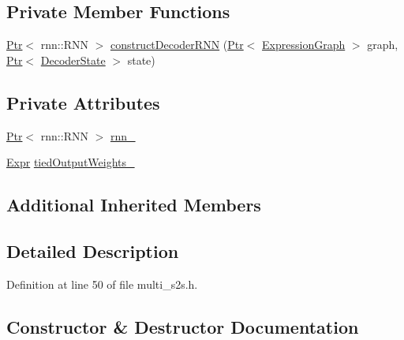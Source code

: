 \subsection*{Private Member Functions}
\begin{DoxyCompactItemize}
\item 
\hyperlink{namespacemarian_ad1a373be43a00ef9ce35666145137b08}{Ptr}$<$ rnn\+::\+R\+NN $>$ \hyperlink{classmarian_1_1MultiDecoderS2S_a9f48a07e49a8b2608eadc93138cde75c}{construct\+Decoder\+R\+NN} (\hyperlink{namespacemarian_ad1a373be43a00ef9ce35666145137b08}{Ptr}$<$ \hyperlink{classmarian_1_1ExpressionGraph}{Expression\+Graph} $>$ graph, \hyperlink{namespacemarian_ad1a373be43a00ef9ce35666145137b08}{Ptr}$<$ \hyperlink{classmarian_1_1DecoderState}{Decoder\+State} $>$ state)
\end{DoxyCompactItemize}
\subsection*{Private Attributes}
\begin{DoxyCompactItemize}
\item 
\hyperlink{namespacemarian_ad1a373be43a00ef9ce35666145137b08}{Ptr}$<$ rnn\+::\+R\+NN $>$ \hyperlink{classmarian_1_1MultiDecoderS2S_aa17bae4e5a1cb917737c8d23511a5701}{rnn\+\_\+}
\item 
\hyperlink{namespacemarian_a498d8baf75b754011078b890b39c8e12}{Expr} \hyperlink{classmarian_1_1MultiDecoderS2S_afbfb909daccdfdbcc46c0240221fbaa9}{tied\+Output\+Weights\+\_\+}
\end{DoxyCompactItemize}
\subsection*{Additional Inherited Members}


\subsection{Detailed Description}


Definition at line 50 of file multi\+\_\+s2s.\+h.



\subsection{Constructor \& Destructor Documentation}

